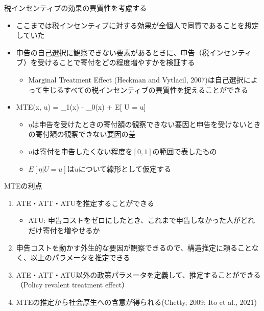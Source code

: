 \documentclass[
  ignorenonframetext,
  aspectratio=169,
]{beamer}
\providecommand{\tightlist}{%
  \setlength{\itemsep}{0pt}\setlength{\parskip}{0pt}}
\begin{document}
\begin{frame}{税インセンティブの効果の異質性を考慮する}
\protect\hypertarget{ux7a0eux30a4ux30f3ux30bbux30f3ux30c6ux30a3ux30d6ux306eux52b9ux679cux306eux7570ux8ceaux6027ux3092ux8003ux616eux3059ux308b}{}
\begin{itemize}
\tightlist
\item
  ここまでは税インセンティブに対する効果が全個人で同質であることを想定していた
\item
  申告の自己選択に観察できない要素があるときに、申告（税インセンティブ）を受けることで寄付をどの程度増やすかを検証する

  \begin{itemize}
  \tightlist
  \item
    Marginal Treatment Effect (Heckman and Vytlacil, 2007)は自己選択によって生じるすべての税インセンティブの異質性を捉えることができる
  \end{itemize}
\item
  MTE(x, u) = \mu\_1(x) - \mu\_0(x) + E{[}\eta \textbar{} U = u{]}

  \begin{itemize}
  \tightlist
  \item
    \(\eta\)は申告を受けたときの寄付額の観察できない要因と申告を受けないときの寄付額の観察できない要因の差
  \item
    \(u\)は寄付を申告したくない程度を\([0, 1]\)の範囲で表したもの
  \item
    \(E[\eta | U = u]\)は\(u\)について線形として仮定する
  \end{itemize}
\end{itemize}
\end{frame}

\begin{frame}{MTEの利点}
\protect\hypertarget{mteux306eux5229ux70b9}{}
\begin{enumerate}
\tightlist
\item
  ATE・ATT・ATUを推定することができる

  \begin{itemize}
  \tightlist
  \item
    ATU: 申告コストをゼロにしたとき、これまで申告しなかった人がどれだけ寄付を増やせるか
  \end{itemize}
\item
  申告コストを動かす外生的な要因が観察できるので、構造推定に頼ることなく、以上のパラメータを推定できる
\item
  ATE・ATT・ATU以外の政策パラメータを定義して、推定することができる（Policy revalent treatment effect）
\item
  MTEの推定から社会厚生への含意が得られる(Chetty, 2009; Ito et al., 2021)
\end{enumerate}
\end{frame}
\end{document}
